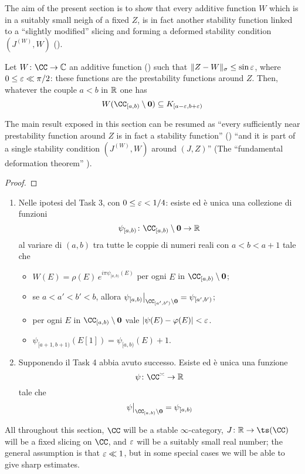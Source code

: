 The aim of the present section is to show that every additive function $W$ which is in a suitably small neigh of a fixed $Z$, is in fact another stability function linked to a ``slightly modified'' slicing and forming a deformed stability condition $(J^{(W)}, W)$ (\adef {}).
\begin{df-prop}
Let $W\colon \CC\to\mathbb{C}$ an additive function (\adef {}) such that $\|Z-W\|_\sigma \le\sin\varepsilon$, where $0 \le \varepsilon \ll\pi/2$: these functions are the prestability functions around $Z$. Then, whatever the couple $a<b$ in $\mathbb{R}$ one has
\[
W(\cab\setminus \mathbf{0}) \subseteq K_{[a-\eps ,b+\eps )}\]
\end{df-prop}
The main result exposed in this section can be resumed as ``every sufficiently near prestability function around $Z$ is in fact a stability function'' (\athm {}) ``and it is part of a single stability condition $(J^{(W)}, W)$ around $(J,Z)$'' (The ``fundamental deformation theorem'' ).
\begin{proof}
\end{proof}
\begin{enumerate}
\item Nelle ipotesi del Task 3, con $0\leq \varepsilon <1/4$: esiste ed \`e unica una collezione di funzioni 
 \[
\psi_{[a,b)}\colon \cab\setminus \mathbf{0} \to \R
\]
al variare di $(a,b)$ tra tutte le coppie di numeri reali con $a<b<a+1$ tale che
\begin{itemize}
\item $W(E)=\rho(E)\, e^{i\pi \psi_{[a,b)}(E)}$ per ogni $E$ in $\cab\setminus\mathbf{0}$;
\item se $a<a'<b'<b$, allora $\psi_{[a,b)}\bigr\vert_{\CC_{[a',b')}\setminus \mathbf{0}}=\psi_{[a',b')}$;
\item per ogni $E$ in $\cab\setminus\mathbf{0}$ vale $|\psi(E)-\varphi(E)|<\varepsilon $.
\item $\psi_{[a+1,b+1)}(E[1])=\psi_{[a,b)}(E)+1$.
\end{itemize}
\item Supponendo il Task 4 abbia avuto successo. Esiste ed \`e unica una funzione
\[
\psi\colon \CC^\thin\to \R
\]
tale che 
\[
\psi\bigr\vert_{\cab\setminus \mathbf{0}}=\psi_{[a,b)}
\]
\end{enumerate}
All throughout this section, $\CC$ will be a stable $\infty$\hyp{}category, $J\colon \R\to \ts(\CC)$ will be a fixed slicing on $\CC$, and $\varepsilon$ will be a suitably small real number; the general assumption is that $\varepsilon\ll 1$, but in some special cases we will be able to give sharp estimates.

